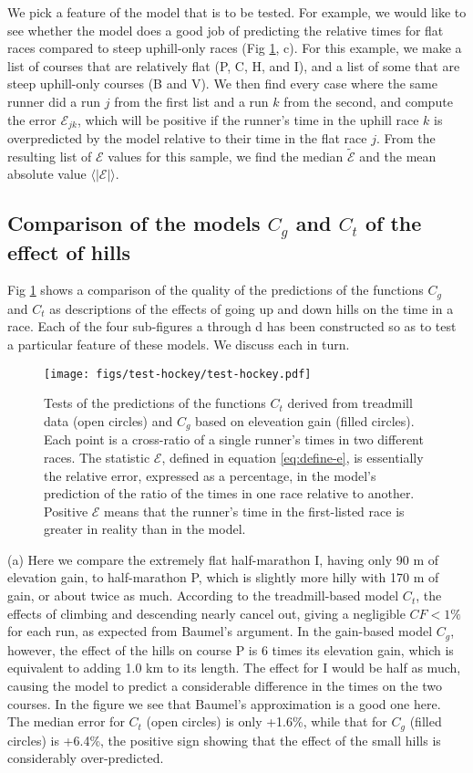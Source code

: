 \documentclass[10pt,letterpaper]{article}
\begin{document}
We pick a feature of the model that is to be tested. For example, we would like to see
whether the model does a good job of predicting the relative times for flat races
compared to steep uphill-only races (Fig \ref{fig:test-hockey}, c). For this example, we make a list of courses
that are relatively flat (P, C, H, and I), and a list of some that are steep uphill-only
courses (B and V). We then find every case where the same runner did a run $j$ from the first
list and a run $k$ from the second, and compute the error $\mathcal{E}_{jk}$, which will be
positive if the runner's time in the uphill race $k$ is overpredicted by the model relative
to their time in the flat race $j$. From the resulting list of $\mathcal{E}$ values for
this sample, we find the median $\widetilde{\mathcal{E}}$ and the mean absolute value $\langle|\mathcal{E}|\rangle$.

\subsection*{Comparison of the models $C_g$ and $C_t$ of the effect of hills}

Fig \ref{fig:test-hockey} shows a comparison of the quality of the predictions of the functions
$C_g$ and $C_t$ as descriptions of the effects of going up and down hills on the time in a race.
Each of the four sub-figures a through d has been constructed so as to test a particular
feature of these models. We discuss each in turn.

\begin{figure}[h]
\texttt{[image: figs/test-hockey/test-hockey.pdf]}
\centering
\caption{Tests of the predictions of the functions $C_t$ derived from treadmill data (open circles)
and $C_g$ based on eleveation gain (filled circles). Each point is a cross-ratio of a single runner's
times in two different races. The statistic $\mathcal{E}$, defined in equation \ref{eq:define-e},
is essentially the relative error, expressed as a percentage, in the model's prediction of the
ratio of the times in one race relative to another. Positive $\mathcal{E}$ means that the runner's
time in the first-listed race is greater in reality than in the model.
}
\label{fig:test-hockey}
\end{figure}

(a) Here we compare the extremely flat half-marathon I, having only 90 m of elevation gain,
to half-marathon P, which is slightly more hilly with 170 m of gain, or about twice as much.
According to the treadmill-based model $C_t$, the effects of climbing and descending
nearly cancel out, giving a negligible $CF<1\%$ for each run, as expected from Baumel's argument.
In the gain-based model $C_g$, however, the effect of the hills on course P is
6 times its elevation gain, which is equivalent to adding 1.0 km to its length. The effect for I would
be half as much, causing the model to predict a considerable difference in the times on
the two courses. In the figure we see that Baumel's approximation is a good one here. The median
error for $C_t$ (open circles) is only +1.6\%, while that for $C_g$ (filled circles) is +6.4\%,
the positive sign showing that the effect of the small hills is considerably over-predicted.
\end{document}
